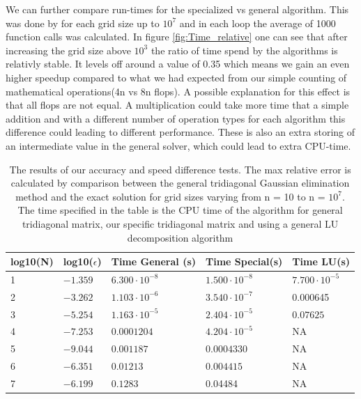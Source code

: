 \documentclass[a4paper,11pt]{article}
\begin{document}
{We can further compare run-times for the specialized vs general algorithm. This was done by for each grid size up to $10^7$ and in each loop the average of 1000 function calls was calculated. In figure \ref{fig:Time_relative} one can see that after increasing the grid size above $10^3$ the ratio of time spend by the algorithms is relativly stable. It levels off around a value of 0.35 which means we gain an even higher speedup compared to what we had expected from our simple counting of mathematical operations(4n vs 8n flops). A possible explanation for this effect is that all flops are not equal. A multiplication could take more time that a simple addition and with a different number of operation types for each algorithm this difference could leading to different performance. These is also an extra storing of an intermediate value in the general solver, which could lead to extra CPU-time. 

		
\begin{table}[H]
	\centering
	\caption{The results of our accuracy and speed difference tests. The max relative error is calculated by comparison between the general tridiagonal Gaussian elimination method and the exact solution for grid sizes varying from n = 10 to n = $10^{7}$. The time specified in the table is the CPU time of the algorithm for general tridiagonal matrix, our specific tridiagonal matrix and using a general LU decomposition algorithm}
	\label{table:Results}
	\begin{tabular}{|lllll|} \hline
		log10(N) & log10($\epsilon$) & Time General (s)     & Time Special(s)      & Time LU(s) \\
		\hline 
		1        & $-1.359$       &$6.300\cdot 10^{-8}$  &$1.500\cdot 10^{-8}$ & $7.700 \cdot 10^{-5}$    \\
		2        & $-3.262$       &$1.103\cdot 10^{-6}$  &$3.540\cdot 10^{-7}$ &  0.000645        \\
		3        & $-5.254$       &$1.163\cdot 10^{-5}$  &$2.404\cdot 10^{-5}$ &   $0.07625$      \\
		4        & $-7.253$       &$0.0001204$ 	         &$4.204\cdot 10^{-5}$ &   NA       \\
		5        & $-9.044$       &$0.001187$	         &$0.0004330$	       &   NA       \\
		6        & $-6.351$       &$0.01213$	         &$0.004415$	           &   NA       \\
		7 		& $-6.199$	& 	$0.1283$ & 	0.04484 & NA \\
		\hline
	\end{tabular}
\end{table}


}
\end{document}
